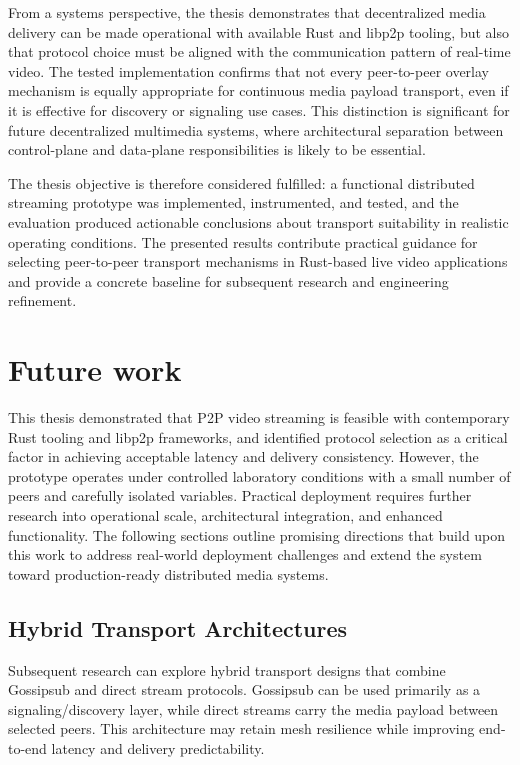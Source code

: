 From a systems perspective, the thesis demonstrates that decentralized media delivery can be made operational with available Rust and libp2p tooling, but also that protocol choice must be aligned with the communication pattern of real-time video. The tested implementation confirms that not every peer-to-peer overlay mechanism is equally appropriate for continuous media payload transport, even if it is effective for discovery or signaling use cases. This distinction is significant for future decentralized multimedia systems, where architectural separation between control-plane and data-plane responsibilities is likely to be essential.

The thesis objective is therefore considered fulfilled: a functional distributed streaming prototype was implemented, instrumented, and tested, and the evaluation produced actionable conclusions about transport suitability in realistic operating conditions. The presented results contribute practical guidance for selecting peer-to-peer transport mechanisms in Rust-based live video applications and provide a concrete baseline for subsequent research and engineering refinement.

\section{Future work}

This thesis demonstrated that \ac{P2P} video streaming is feasible with contemporary Rust tooling and libp2p frameworks, and identified protocol selection as a critical factor in achieving acceptable latency and delivery consistency. However, the prototype operates under controlled laboratory conditions with a small number of peers and carefully isolated variables. Practical deployment requires further research into operational scale, architectural integration, and enhanced functionality. The following sections outline promising directions that build upon this work to address real-world deployment challenges and extend the system toward production-ready distributed media systems.

\subsection{Hybrid Transport Architectures}
Subsequent research can explore hybrid transport designs that combine Gossipsub and direct stream protocols. Gossipsub can be used primarily as a signaling/discovery layer, while direct streams carry the media payload between selected peers. This architecture may retain mesh resilience while improving end-to-end latency and delivery predictability.
